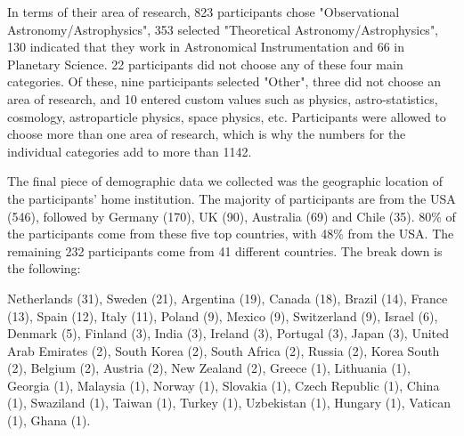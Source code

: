 In terms of their area of research, 823 participants chose "Observational Astronomy/Astrophysics", 353 selected "Theoretical Astronomy/Astrophysics", 130 indicated that they work in Astronomical Instrumentation and 66 in Planetary Science. 22 participants did not choose any of these four main categories. Of these, nine participants selected "Other", three did not choose an area of research, and 10 entered custom values such as physics, astro-statistics, cosmology, astroparticle physics, space physics, etc. Participants were allowed to choose more than one area of research, which is why the numbers for the individual categories add to more than 1142. 

The final piece of demographic data we collected was the geographic location of the participants' home institution. The majority of participants are from the USA (546), followed by Germany (170), UK (90), Australia (69) and Chile (35). 80\% of the participants come from these five top countries, with 48\% from the USA. The remaining 232 participants come from 41 different countries. The break down is the following:

             Netherlands     (31),
                  Sweden     (21),
               Argentina     (19),
                  Canada     (18),
                  Brazil     (14),
                  France     (13),
                   Spain     (12),
                   Italy     (11),
                  Poland      (9),
                  Mexico      (9),
             Switzerland      (9),
                  Israel      (6),
                 Denmark      (5),
                 Finland      (3),
                   India      (3),
                 Ireland      (3),
                Portugal      (3),
                   Japan      (3),
    United Arab Emirates      (2),
             South Korea      (2),
            South Africa      (2),
                  Russia      (2),
             Korea South      (2),
                 Belgium      (2),
                 Austria      (2),
             New Zealand      (2),
                  Greece      (1),
               Lithuania      (1),
                 Georgia      (1),
                Malaysia      (1),
                  Norway      (1),
                Slovakia      (1),
          Czech Republic      (1),
                   China      (1),
               Swaziland      (1),
                  Taiwan      (1),
                  Turkey      (1),
              Uzbekistan      (1),
                 Hungary      (1),
                Vatican       (1),
                   Ghana      (1).
                   

